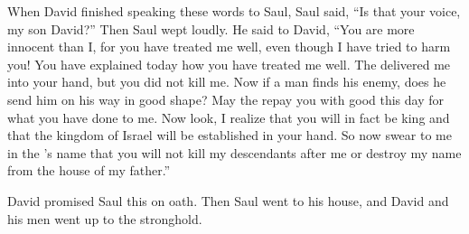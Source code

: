 {\par }{\PP {}When
David
finished
speaking
these
words
to
Saul,
Saul
said,
“Is that your voice,
my son
David?” Then
Saul
wept
loudly.
He said
to
David,
“You
are more innocent
than
I, for
you
have treated
me well,
even though I
have tried
to harm you!
You
have explained
today
how
you have
treated
me well.
The
{}
delivered
me into your hand,
but you did not
kill me.
Now if
a man
finds
his enemy,
does he send
him on his way
in good
shape? May the
{}
repay
you with good
this
day
for what
you have
done to me.
Now
look,
I realize
that
you will in fact be
king
and that
the kingdom
of Israel
will be established
in your hand.
So now
swear
to me in the
{}’s
name that you will not
kill
my descendants
after
me or
destroy
my name
from the house
of my father.”
\par }{\PP {}David
promised
Saul
this on oath. Then Saul
went
to
his house,
and David
and his men
went up
to the stronghold.

}

